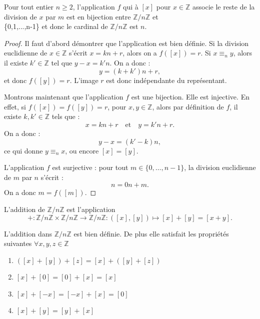 \begin{proposition}
    Pour tout entier $n\geq 2$, l'application $f$ qui à $[x]$ pour $x\in \mathbb{Z}$ associe le reste de la division de $x$ par $m$ est en bijection entre $\mathbb{Z}/n\mathbb{Z}$ et \\ \{0,1,...,n-1\} et donc le cardinal de $\mathbb{Z}/n\mathbb{Z}$ est $n$.
\end{proposition}

\begin{proof}
    Il faut d’abord démontrer que l’application est bien définie. Si la division euclidienne de \( x \in \mathbb{Z} \) s’écrit \( x = kn + r \), alors on a \( f([x]) = r \). Si \( x \equiv_n y \), alors il existe \( k' \in \mathbb{Z} \) tel que \( y - x = k'n \). On a donc :
\[
y = (k + k')n + r,
\]
et donc \( f([y]) = r \). L’image \( r \) est donc indépendante du représentant.

Montrons maintenant que l’application \( f \) est une bijection. Elle est injective. En effet, si \( f([x]) = f([y]) = r \), pour \( x, y \in \mathbb{Z} \), alors par définition de \( f \), il existe \( k, k' \in \mathbb{Z} \) tels que :
\[
x = kn+ r \quad \text{et} \quad y = k'n + r.
\]
On a donc :
\[
y - x = (k' - k)n,
\]
ce qui donne \( y \equiv_n x \), ou encore \( [x] = [y] \).

L’application \( f \) est surjective : pour tout \( m \in \{0, \dots, n-1\} \), la division euclidienne de \( m \) par \( n\) s’écrit :
\[
n = 0n + m.
\]
On a donc \( m = f([m]) \).
\end{proof}

\begin{definition}
    L'addition de $\mathbb{Z}/n\mathbb{Z}$ est l'application
    \[
    +:\mathbb{Z}/n\mathbb{Z}\times\mathbb{Z}/n\mathbb{Z} \to\mathbb{Z}/n\mathbb{Z} : ([x],[y])\mapsto[x]+[y]=[x+y].
    \]
\end{definition}

\begin{proposition}
    L'addition dans $\mathbb{Z}/n\mathbb{Z}$ est bien définie. De plus elle satisfait les propriétés suivantes
    $\forall x,y,z\in \mathbb{Z}$
    \begin{enumerate}
        \item $([x]+[y])+[z]=[x]+([y]+[z])$
        \item $[x]+[0]=[0]+[x]=[x]$
        \item $[x]+[-x]=[-x]+[x]=[0]$
        \item $[x]+[y]=[y]+[x]$
    \end{enumerate}
\end{proposition}


